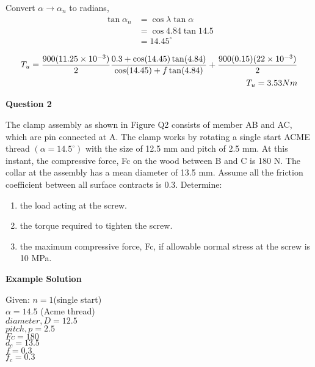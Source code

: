 \documentclass[a4paper, fleqn]{article}
\providecommand{\sci}[1]{\protect\ensuremath{\times 10^{\StrSubstitute[0]{#1}{e}{}}}}
\begin{document}
Convert $\alpha \rightarrow \alpha_n$ to radians,
\begin{equation*}
    \begin{aligned}
    \tan \alpha_n &= \cos \lambda \tan \alpha\\
     &= \cos 4.84 \tan 14.5\\
    &= 14.45^{\circ}
    \end{aligned}
\end{equation*}

\begin{equation*}
    \begin{aligned}
    T_u = \frac{900(11.25\sci{e-3})}{2} \frac{0.3+\cos(14.45) \tan(4.84)}{\cos(14.45) + f\tan(4.84)} + \frac{900(0.15)(22\sci{e-3})}{2} \\
    T_u=3.53 Nm
    \end{aligned}
\end{equation*}




\newpage
\textbf{Question 2}

The clamp assembly as shown in Figure Q2 consists of member AB and AC, which are pin connected at A. The clamp works by rotating a single start ACME thread $(\alpha=14.5^{\circ})$ with the size of 12.5 mm and pitch of 2.5 mm. At this instant, the compressive force, Fc on the wood between B and C is 180 N. The collar at the assembly has a mean diameter of 13.5 mm. Assume all the friction coefficient between all surface contracts is 0.3. Determine:

\begin{enumerate}[label=(\roman*)]
    \item the load acting at the screw.

    \item the torque required to tighten the screw.

    \item the maximum compressive force, Fc, if allowable normal stress at the screw is 10 MPa.
\end{enumerate}


\textbf{Example Solution}

Given:
$n = 1$(single start)\\
$\alpha = 14.5$ (Acme thread)\\
$diameter,D = 12.5$\\
$pitch,p = 2.5$\\
$Fc = 180$\\
$d_c = 13.5$\\
$f = 0.3$\\
$f_c = 0.3$\\
\vspace{10pt}
\end{document}
